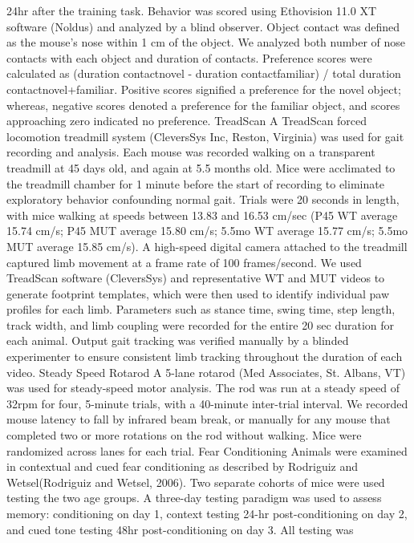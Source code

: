 24hr after the training task. Behavior was scored using Ethovision 11.0 XT
software (Noldus) and analyzed by a blind observer. Object contact was defined
as the mouse’s nose within 1 cm of the object. We analyzed both number of nose
contacts with each object and duration of contacts. Preference scores were
calculated as (duration contactnovel - duration contactfamiliar) / total
duration contactnovel+familiar. Positive scores signified a preference for the
novel object; whereas, negative scores denoted a preference for the familiar
object, and scores approaching zero indicated no preference.
TreadScan
A TreadScan forced locomotion treadmill system (CleversSys Inc, Reston,
Virginia) was used for gait recording and analysis. Each mouse was recorded
walking on a transparent treadmill at 45 days old, and again at 5.5 months old.
Mice were acclimated to the treadmill chamber for 1 minute before the start of
recording to eliminate exploratory behavior confounding normal gait. Trials were
20 seconds in length, with mice walking at speeds between 13.83 and 16.53 cm/sec
(P45 WT average 15.74 cm/s; P45 MUT average 15.80 cm/s; 5.5mo WT average 15.77
cm/s; 5.5mo MUT average 15.85 cm/s). A high-speed digital camera attached to the
treadmill captured limb movement at a frame rate of 100 frames/second. We used
TreadScan software (CleversSys) and representative WT and MUT videos to generate
footprint templates, which were then used to identify individual paw profiles
for each limb. Parameters such as stance time, swing time, step length, track
width, and limb coupling were recorded for the entire 20 sec duration for each
animal. Output gait tracking was verified manually by a blinded experimenter to
ensure consistent limb tracking throughout the duration of each video. 
Steady Speed Rotarod
A 5-lane rotarod (Med Associates, St. Albans, VT) was used for steady-speed
motor analysis. The rod was run at a steady speed of 32rpm for four, 5-minute
trials, with a 40-minute inter-trial interval. We recorded mouse latency to fall
by infrared beam break, or manually for any mouse that completed two or more
rotations on the rod without walking. Mice were randomized across lanes for each
trial. 
Fear Conditioning
Animals were examined in contextual and cued fear conditioning as described by
Rodriguiz and Wetsel(Rodriguiz and Wetsel, 2006). Two separate cohorts of mice
were used testing the two age groups. A three-day testing paradigm was used to
assess memory: conditioning on day 1, context testing 24-hr post-conditioning on
day 2, and cued tone testing 48hr post-conditioning on day 3. All testing was
